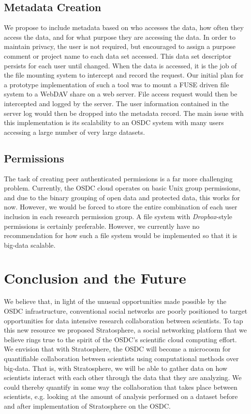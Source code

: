 \begin{multicols*}{2}
\subsection{Metadata Creation}

We propose to include metadata based on who accesses the data, how
often they access the data, and for what purpose they are accessing
the data.  In order to maintain privacy, the user is not required, but
encouraged to assign a purpose comment or project name to each data set
accessed. This data set descriptor persists for each user until
changed.  When the data is accessed, it is the job of the file
mounting system to intercept and record the request. Our initial plan
for a prototype implementation of such a tool  was to mount a FUSE driven file
system to a WebDAV share on a web server. File access request would
then be intercepted and logged by the server. The user information
contained in the server log would then be dropped into the metadata
record. The main issue with this implementation is its scalability to
an OSDC system with many users accessing a large number of very large
datasets.        

\subsection{Permissions}

The task of creating peer authenticated permissions is a far more
challenging problem. Currently, the OSDC cloud operates on basic Unix
group permissions, and due to the binary grouping of open data and
protected data, this works for now. However, we would be forced to
store the entire combination of each user inclusion in each research
permission group. A file system with \emph{Dropbox}-style
permissions is certainly preferable. However, we currently have no
recommendation for how such a file system would be implemented so that
it is big-data scalable.


\section{Conclusion and the Future}
\label{sec:conclusion}

We believe that, in light of the unusual opportunities made possible
by the OSDC infrastructure, conventional social networks are poorly positioned
to target opportunities for data intensive research collaboration
between scientists. To tap this new resource we proposed Stratosphere, a social
networking platform that we believe rings true to the spirit of the OSDC's
scientific cloud computing effort. We envision that with Stratosphere, 
the OSDC will become a microcosm for quantifiable collaboration between
scientists using computational methods over big-data. That is, with
Stratosphere, we will be able to gather data on how scientists
interact with each other through the data that they are analyzing. We could
thereby quantify in some way the collaboration that takes place
between scientists, e.g. looking at the amount of analysis performed
on a dataset before and after implementation of Stratosphere on the OSDC.  

\end{multicols*}

